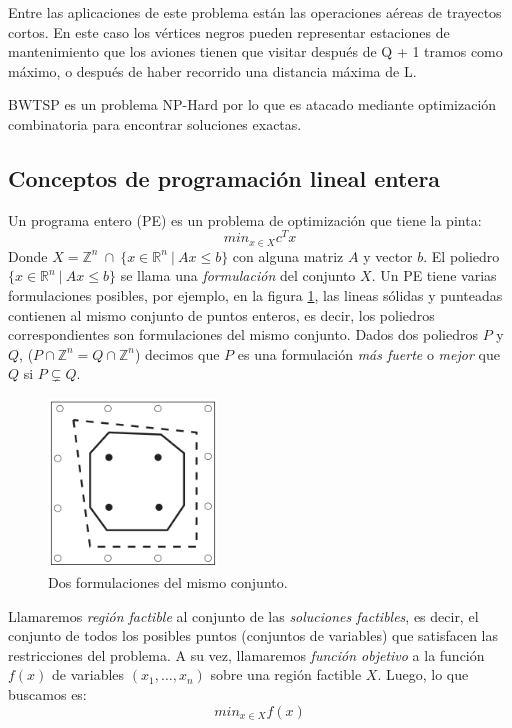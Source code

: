 \documentclass[10pt, a4paper]{article}
\theoremstyle{definition}
\begin{document}
Entre las aplicaciones de este problema están las operaciones aéreas de trayectos cortos. En este caso los vértices negros pueden representar estaciones de mantenimiento que los aviones tienen que visitar después de Q + 1 tramos como máximo, o después de haber recorrido una distancia máxima de L.

BWTSP es un problema NP-Hard por lo que es atacado mediante optimización combinatoria para encontrar soluciones exactas.

\subsection{Conceptos de programación lineal entera}

Un programa entero (PE) es un problema de optimización que tiene la pinta:
$$min_{x \in X} c^Tx$$
Donde $X = \mathds{Z}^n\ \cap\ \{x \in \mathds{R}^n\ |\ Ax \leq b \}$ con alguna matriz $A$ y vector $b$. El poliedro $\{x \in \mathds{R}^n\ |\ Ax \leq b \}$ se llama una \textit{formulación} del conjunto $X$.
Un PE tiene varias formulaciones posibles, por ejemplo, en la figura \ref{fig:ejemplo_formulaciones}, las lineas sólidas y punteadas contienen al mismo conjunto de puntos enteros, es decir, los poliedros correspondientes son formulaciones del mismo conjunto.
Dados dos poliedros $P$ y $Q$, ($P \cap \mathds{Z}^n = Q \cap \mathds{Z}^n$) decimos que $P$ es una formulación \textit{más fuerte} o \textit{mejor} que $Q$ si $P \subsetneq Q$.

\begin{figure}[H]
  \centering
  \includegraphics[width=0.4\textwidth]{ejemplo_formulaciones.png}
  \caption{Dos formulaciones del mismo conjunto.}
  \label{fig:ejemplo_formulaciones}
\end{figure}

Llamaremos \textit{región factible} al conjunto de las \textit{soluciones factibles}, es decir, el conjunto de todos los posibles puntos (conjuntos de variables) que satisfacen las restricciones del problema. A su vez, llamaremos \textit{función objetivo} a la función $f(x)$ de variables $(x_1,\dots,x_n)$ sobre una región factible $X$. Luego, lo que buscamos es:
$$min_{x \in X} f(x)$$
\end{document}
